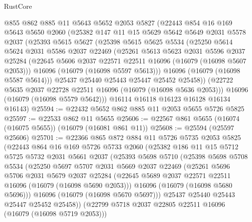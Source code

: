 \begin{lexlean}{RustCore}
\begin{coremodule}
    @855
    @862
    @885
    @11
    @5643
    @5652
    @2053
    @5827
    (@22443
      @854
      @16
      @169
      @5643
      @5650
      @2060
      (@25382
        @147
        @11
        @15
        @5629
        @5642
        @5649
        @2031
        @5578
        @2037
        (@25393
          @5615
          @5627
          (@25398
            @5615
            @5625
            @5534
            (@25250
              @5614
              @5624
              @2031
              @5586
              @2037
              @22469
              (@25261
                @5613
                @5623
                @2031
                @5596
                @2037
                @25284
                (@22645 @5606 @2037 @22571 @22511 @16096 (@16079 (@16098 @5607 @2053)))
                @16096
                (@16079 (@16098 @5597 @5613)))
              @16096
              (@16079 (@16098 @5587 @5614)))
            @25437
            @25440
            @25443
            @25447
            @25452
            @25458))
        (@22722 @5635 @2037 @22728 @22511 @16096 (@16079 (@16098 @5636 @2053)))
        @16096
        (@16079 (@16098 @5579 @5642)))
      @16114
      @16118
      @16123
      @16128
      @16134
      @16143)
@25594 := @22432 @5652 @862 @885 @11 @2053 @5655 @5726 @5825
@25597 := @22533 @862 @11 @5655
@25606 := @22567 @861 @5655 (@16074 (@16075 @5655)) (@16079 (@16081 @861 @11))
@25608 := @25594 (@25597 @25606)
@25701 := @22366
    @865
    @872
    @884
    @11
    @5726
    @5735
    @2053
    @5825
    (@22443
      @864
      @16
      @169
      @5726
      @5733
      @2060
      (@25382
        @186
        @11
        @15
        @5712
        @5725
        @5732
        @2031
        @5661
        @2037
        (@25393
          @5698
          @5710
          (@25398
            @5698
            @5708
            @5534
            (@25250
              @5697
              @5707
              @2031
              @5669
              @2037
              @22469
              (@25261
                @5696
                @5706
                @2031
                @5679
                @2037
                @25284
                (@22645 @5689 @2037 @22571 @22511 @16096 (@16079 (@16098 @5690 @2053)))
                @16096
                (@16079 (@16098 @5680 @5696)))
              @16096
              (@16079 (@16098 @5670 @5697)))
            @25437
            @25440
            @25443
            @25447
            @25452
            @25458))
        (@22799 @5718 @2037 @22805 @22511 @16096 (@16079 (@16098 @5719 @2053)))

\end{coremodule}
\end{lexlean}
